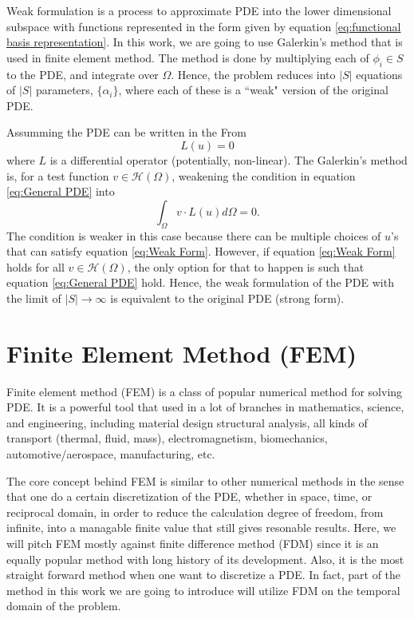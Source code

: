 \documentclass[preprint, 12pt]{revtex4-2}
\numberwithin{equation}{section}
\begin{document}
Weak formulation is a process to approximate PDE into the lower dimensional subspace with functions represented in the form given by equation \ref{eq:functional basis representation}. In this work, we are going to use Galerkin's method that is used in finite element method. The method is done by multiplying each of $\phi_i\in S$ to the PDE, and integrate over $\Omega$. Hence, the problem reduces into $|S|$ equations of $|S|$ parameters, $\{\alpha_i\}$, where each of these is a ``weak" version of the original PDE. 

Assumming the PDE can be written in the From
\begin{equation}\label{eq:General PDE}
    L(u) = 0
\end{equation}
where $L$ is a differential operator (potentially, non-linear). The Galerkin's method is, for a test function $v\in \mathcal{H}(\Omega)$, weakening the condition in equation \ref{eq:General PDE} into
\begin{equation}\label{eq:Weak Form}
    \int_\Omega v\cdot L(u)d\Omega = 0.
\end{equation}
The condition is weaker in this case because there can be multiple choices of $u$'s that can satisfy equation \ref{eq:Weak Form}. However, if equation \ref{eq:Weak Form} holds for all $v\in \mathcal{H}(\Omega)$, the only option for that to happen is such that equation \ref{eq:General PDE} hold. Hence, the weak formulation of the PDE with the limit of $|S|\rightarrow\infty$ is equivalent to the original PDE (strong form).

\section{Finite Element Method (FEM)}
Finite element method (FEM) is a class of popular numerical method for solving PDE. It is a powerful tool that used in a lot of branches in mathematics, science, and engineering, including material design structural analysis, all kinds of transport (thermal, fluid, mass), electromagnetism, biomechanics, automotive/aerospace, manufacturing, etc.

The core concept behind FEM is similar to other numerical methods in the sense that one do a certain discretization of the PDE, whether in space, time, or reciprocal domain, in order to reduce the calculation degree of freedom, from infinite, into a managable finite value that still gives resonable results. Here, we will pitch FEM mostly against finite difference method (FDM) since it is an equally popular method with long history of its development. Also, it is the most straight forward method when one want to discretize a PDE. In fact, part of the method in this work we are going to introduce will utilize FDM on the temporal domain of the problem.
\end{document}
